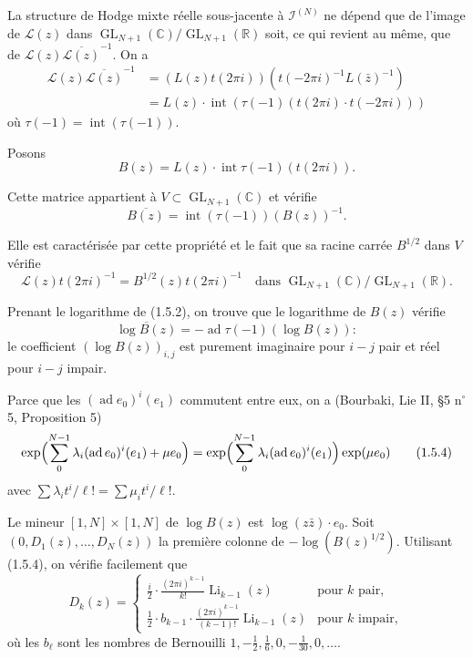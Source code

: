 \documentclass[12pt,a4paper]{article}
\theoremstyle{plain}
\theoremstyle{definition}
\theoremstyle{remark}
\DeclareMathOperator{\ad}{ad}
\DeclareMathOperator{\intt}{int}
\newcommand{\R}{\mathbb{R}}
\newcommand{\C}{\mathbb{C}}
\begin{document}
La structure de Hodge mixte r{\'e}elle sous-jacente {\`a} $\mathcal{I}^{(N)}$ ne d{\'e}pend que de l'image de $\mathcal{L}(z)$ dans $\operatorname{GL}_{N+1}(\C)/\operatorname{GL}_{N+1}(\R)$ soit, ce qui revient au m{\^e}me, que de $\mathcal{L}(z)\overline{\mathcal{L}(z)}^{-1}$. On a
\begin{align*}
\mathcal{L}(z)\overline{\mathcal{L}(z)}^{-1} &= (L(z)t(2\pi i))(t(-2\pi i)^{-1}L(\bar{z})^{-1})\\
&= L(z)\cdot\intt(\tau(-1)(t(2\pi i)\cdot t(-2\pi i)))
\end{align*}
o{\`u} $\tau(-1)=\intt(\tau(-1))$.

Posons
\begin{equation}\label{eq:1.5.1}
B(z) = L(z)\cdot\intt\tau(-1)(t(2\pi i)).
\tag{1.5.1}
\end{equation}

Cette matrice appartient {\`a} $V\subset\operatorname{GL}_{N+1}(\C)$ et v{\'e}rifie
\begin{equation}\label{eq:1.5.2}
\overline{B(z)} = \intt(\tau(-1))(B(z))^{-1}.
\tag{1.5.2}
\end{equation}

Elle est caract{\'e}ris{\'e}e par cette propri{\'e}t{\'e} et le fait que sa racine carr{\'e}e $B^{1/2}$ dans $V$ v{\'e}rifie
\begin{equation}\label{eq:1.5.3}
\mathcal{L}(z)t(2\pi i)^{-1} = B^{1/2}(z)t(2\pi i)^{-1} \quad \text{dans }\operatorname{GL}_{N+1}(\C)/\operatorname{GL}_{N+1}(\R).
\tag{1.5.3}
\end{equation}

Prenant le logarithme de (1.5.2), on trouve que le logarithme de $B(z)$ v{\'e}rifie
\begin{equation*}
\overline{\log B(z)} = -\ad\tau(-1)(\log B(z)):
\end{equation*}
le coefficient $(\log B(z))_{i,j}$ est purement imaginaire pour $i-j$ pair et r{\'e}el pour $i-j$ impair.

Parce que les $(\ad e_0)^i(e_1)$ commutent entre eux, on a (Bourbaki, Lie II, \S 5 n$^\circ$ 5, Proposition 5)
\begin{equation}\label{eq:1.5.4}
\exp\Bigl(\sum_0^{N-1}\lambda_i(\ad e_0)^i(e_1)+\mu e_0\Bigr) = \exp\Bigl(\sum_0^{N-1}\lambda_i(\ad e_0)^i(e_1)\Bigr)\exp(\mu e_0)
\tag{1.5.4}
\end{equation}
avec $\sum\lambda_it^i/\ell!=\sum\mu_i t^i/\ell!$.

Le mineur $[1,N]\times[1,N]$ de $\log B(z)$ est $\log(z\bar{z})\cdot e_0$. Soit $(0,D_1(z),\ldots,D_N(z))$ la premi{\`e}re colonne de $-\log(B(z)^{1/2})$. Utilisant (1.5.4), on v{\'e}rifie facilement que
\begin{equation*}
D_k(z) = \begin{cases}
\displaystyle\frac{i}{2}\cdot\frac{(2\pi i)^{k-1}}{k!}\operatorname{Li}_{k-1}(z) & \text{pour }k\text{ pair},\\[1.5ex]
\displaystyle\frac{1}{2}\cdot b_{k-1}\cdot\frac{(2\pi i)^{k-1}}{(k-1)!}\operatorname{Li}_{k-1}(z) & \text{pour }k\text{ impair},
\end{cases}
\end{equation*}
o{\`u} les $b_\ell$ sont les nombres de Bernouilli $1,-\tfrac{1}{2},\tfrac{1}{6},0,-\tfrac{1}{30},0,\ldots$.
\end{document}
